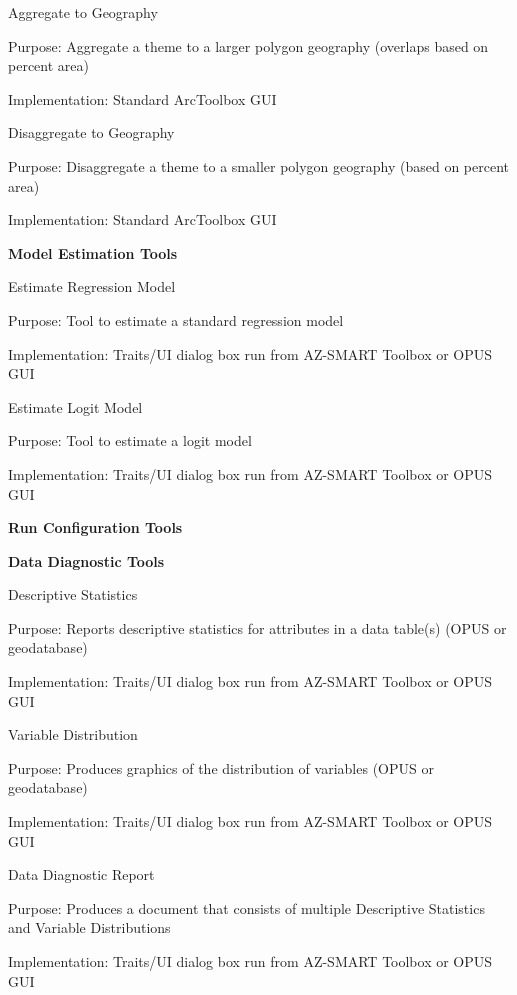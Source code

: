 \bigskip

Aggregate to Geography

Purpose: Aggregate a theme to a larger polygon geography (overlaps based on percent area)

Implementation: Standard ArcToolbox GUI

\bigskip

Disaggregate to Geography

Purpose: Disaggregate a theme to a smaller polygon geography (based on percent area)

Implementation: Standard ArcToolbox GUI

\bigskip

\textbf{Model Estimation Tools}

Estimate Regression Model

Purpose: Tool to estimate a standard regression model

Implementation: Traits/UI dialog box run from AZ-SMART Toolbox or OPUS GUI

\bigskip

Estimate Logit Model

Purpose: Tool to estimate a logit model

Implementation: Traits/UI dialog box run from AZ-SMART Toolbox or OPUS GUI

\bigskip

\textbf{Run Configuration Tools}

\bigskip

\textbf{Data Diagnostic Tools}

\bigskip

Descriptive Statistics

Purpose: Reports descriptive statistics for attributes in a data table(s) (OPUS or geodatabase)

Implementation: Traits/UI dialog box run from AZ-SMART Toolbox or OPUS GUI

\bigskip

Variable Distribution

Purpose: Produces graphics of the distribution of variables (OPUS or geodatabase)

Implementation: Traits/UI dialog box run from AZ-SMART Toolbox or OPUS GUI

\bigskip

Data Diagnostic Report

Purpose: Produces a document that consists of multiple Descriptive Statistics and Variable Distributions

Implementation: Traits/UI dialog box run from AZ-SMART Toolbox or OPUS GUI


